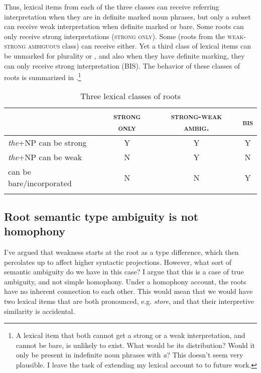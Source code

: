 \documentclass[output=paper,
modfonts
]{langscibook}
\begin{document}
Thus, lexical items from each of the three classes can receive referring interpretation when they are in definite marked noun phrases, but only a subset can receive weak interpretation when definite marked or bare. Some roots can only receive strong interpretations (\textsc{strong only}). Some (roots from the \textsc{weak-strong ambiguous} class) can receive either. Yet a third class of lexical items can be unmarked for plurality or , and also when they have definite marking, they can only receive strong interpretation (\textsc{BIS}). The behavior of these classes of roots is summarized in .\footnote{A lexical item that both cannot get a strong or a weak interpretation, and cannot be bare, is unlikely to exist. What would be its distribution? Would it only be present in indefinite noun phrases with \textit{a}? This doesn't seem very plausible. I leave the task of extending my lexical account to  to future work.} 

\begin{table}[h]
\caption{Three lexical classes of roots}
\label{tab:williams:3}
\begin{tabularx}{\textwidth}{lccc} 
 \lsptoprule
 & \textsc{strong only} & \textsc{strong-weak ambig.}  & \textsc{bis}\\ 
 \midrule
 \textit{the}+NP can be strong  &  \textsc{Y} &     \textsc{Y}  &  \textsc{Y}  \\
 \textit{the}+NP can be weak  &   \textsc{N}  & \textsc{Y} & \textsc{N} \\
 can be bare/incorporated  &   \textsc{N}  & \textsc{N} & \textsc{Y} \\
 \lspbottomrule
\end{tabularx}
\end{table}

\subsection{Root semantic type ambiguity is not homophony}

I've argued that weakness starts at the root as a type difference, which then percolates up to affect higher syntactic projections. However, what sort of semantic ambiguity do we have in this case? I argue that this is a case of true ambiguity, and not simple homophony.  Under a homophony account, the roots have no inherent connection to each other. This would mean that we would have two lexical items that are both pronounced, e.g. \textit{store}, and that their interpretive similarity is accidental. 
\end{document}
